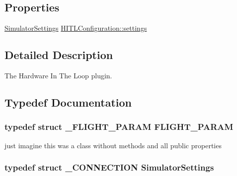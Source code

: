 \subsection*{\-Properties}
\begin{DoxyCompactItemize}
\item 
\hyperlink{group___h_i_t_l_plugin_ga052199f1328d3002bce3e45345aa7f4e}{\-Simulator\-Settings} \hyperlink{group___h_i_t_l_plugin_ga961f33f3db5f79daaf792a4999ac5c06}{\-H\-I\-T\-L\-Configuration\-::settings}
\end{DoxyCompactItemize}


\subsection{\-Detailed \-Description}
\-The \-Hardware \-In \-The \-Loop plugin. 

\subsection{\-Typedef \-Documentation}
\hypertarget{group___h_i_t_l_plugin_ga7bda7a22b899fe8dff0ba9a0cae99da6}{
\subsubsection[{\-F\-L\-I\-G\-H\-T\-\_\-\-P\-A\-R\-A\-M}]{\setlength{\rightskip}{0pt plus 5cm}typedef struct {\bf \-\_\-\-F\-L\-I\-G\-H\-T\-\_\-\-P\-A\-R\-A\-M}  {\bf \-F\-L\-I\-G\-H\-T\-\_\-\-P\-A\-R\-A\-M}}}\label{group___h_i_t_l_plugin_ga7bda7a22b899fe8dff0ba9a0cae99da6}
just imagine this was a class without methods and all public properties \hypertarget{group___h_i_t_l_plugin_ga052199f1328d3002bce3e45345aa7f4e}{
\subsubsection[{\-Simulator\-Settings}]{\setlength{\rightskip}{0pt plus 5cm}typedef struct {\bf \-\_\-\-C\-O\-N\-N\-E\-C\-T\-I\-O\-N}  {\bf \-Simulator\-Settings}}}\label{group___h_i_t_l_plugin_ga052199f1328d3002bce3e45345aa7f4e}


